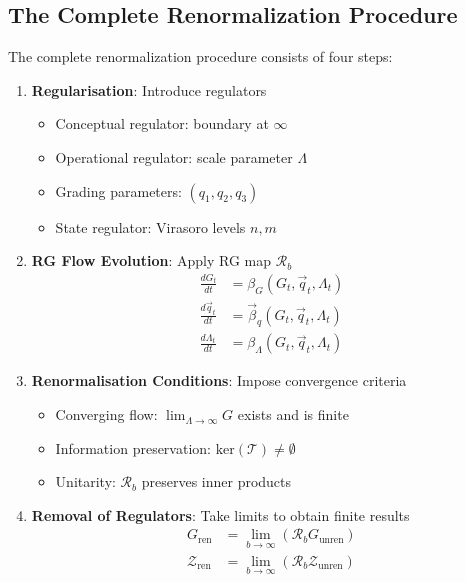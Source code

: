 \subsection{The Complete Renormalization Procedure}

\begin{definition}
\label{def:complete-renorm}
The complete renormalization procedure consists of four steps:

\begin{enumerate}
\item \textbf{Regularisation}: Introduce regulators
   \begin{itemize}
   \item Conceptual regulator: boundary at $\infty$
   \item Operational regulator: scale parameter $\Lambda$
   \item Grading parameters: $(q_1, q_2, q_3)$
   \item State regulator: Virasoro levels $n, m$
   \end{itemize}

\item \textbf{RG Flow Evolution}: Apply RG map $\mathcal{R}_b$
   \begin{align}
   \frac{dG_t}{dt} &= \beta_G(G_t, \vec{q}_t, \Lambda_t) \\
   \frac{d\vec{q}_t}{dt} &= \vec{\beta}_q(G_t, \vec{q}_t, \Lambda_t) \\
   \frac{d\Lambda_t}{dt} &= \beta_\Lambda(G_t, \vec{q}_t, \Lambda_t)
   \end{align}

\item \textbf{Renormalisation Conditions}: Impose convergence criteria
   \begin{itemize}
   \item Converging flow: $\lim_{\Lambda \to \infty} G$ exists and is finite
   \item Information preservation: $\text{ker}(\mathcal{T}) \neq \emptyset$
   \item Unitarity: $\mathcal{R}_b$ preserves inner products
   \end{itemize}

\item \textbf{Removal of Regulators}: Take limits to obtain finite results
   \begin{align}
   G_{\text{ren}} &= \lim_{b \to \infty} (\mathcal{R}_b G_{\text{unren}}) \\
   \mathcal{Z}_{\text{ren}} &= \lim_{b \to \infty} (\mathcal{R}_b \mathcal{Z}_{\text{unren}})
   \end{align}
\end{enumerate}
\end{definition}

